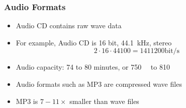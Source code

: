 \begin{frame}
  \frametitle{Audio Formats}
  \begin{itemize}
    \item Audio CD contains raw wave data
    \item For example, Audio CD is 16 bit, \SI{44.1}{\kilo\hertz}, stereo
          \[
            2 \cdot 16 \cdot \num{44100} = \num{1411200} \textrm{bit/s}
          \]
    \item Audio capacity: 74 to 80 minutes, or \SI{750}{\mega\byte} to \SI{810}{\mega\byte}
  \end{itemize}
  \vskip5mm
  \begin{itemize}
    \item Audio formats such as MP3 are compressed wave files
    \item MP3 is $7-11\times$ smaller than wave files
  \end{itemize}
\end{frame}




